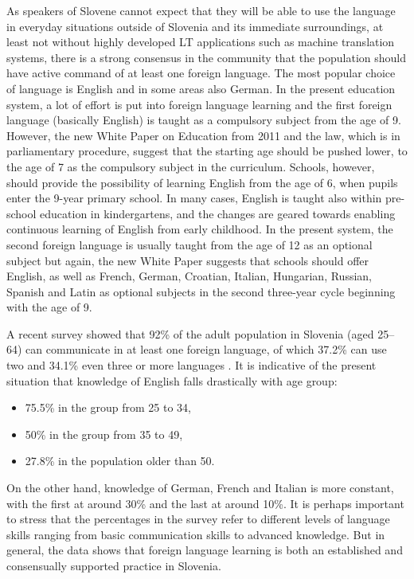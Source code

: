 \begin{multicols}{2}
As speakers of Slovene cannot expect that they will be able to use the language in everyday situations outside of Slovenia and its immediate surroundings, at least not without highly developed LT applications such as machine translation systems, there is a strong consensus in the community that the population should have active command of at least one foreign language. The most popular choice of language is English and in some areas also German. In the present education system, a lot of effort is put into foreign language learning and the first foreign language (basically English) is taught as a compulsory subject from the age of 9. However, the new White Paper on Education  from 2011  \cite{BK1} and the law, which is in parliamentary procedure, suggest that the starting age should be pushed lower, to the age of 7 as the compulsory subject in the curriculum. Schools, however, should provide the possibility of learning English from the age of 6, when pupils enter the 9-year primary school. In many cases, English is taught also within pre-school education in kindergartens, and the changes are geared towards enabling continuous learning of English from early childhood. In the present system, the second foreign language is usually taught from the age of 12 as an optional subject but again, the new White Paper suggests that schools should offer English, as well as French, German, Croatian, Italian, Hungarian, Russian, Spanish and Latin as optional subjects in the second three-year cycle beginning with the age of 9. \vspace*{-0.09 cm}

A recent survey showed that 92\% of the adult population in Slovenia (aged 25--64) can communicate in at least one foreign language, of which 37.2\% can use two and 34.1\% even three or more languages \cite{SURS2}.  It is indicative of the present situation that knowledge of English falls drastically with age group: 
\begin{itemize}
\item 75.5\% in the group from 25 to 34, 
\item 50\% in the group from 35 to 49, 
\item 27.8\% in the population older than 50.
\end{itemize}
On the other hand, knowledge of German, French and Italian is more constant, with the first at around 30\% and the last at around 10\%. It is perhaps important to stress that the percentages in the survey refer to different levels of language skills ranging from basic communication skills to advanced knowledge. But in general, the data shows that foreign language learning is both an established and consensually supported practice in Slovenia.


\end{multicols}
